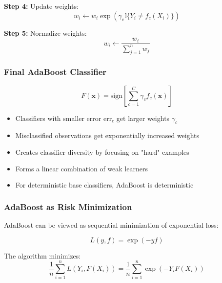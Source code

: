 \documentclass[12pt,a4paper]{article}
\begin{document}
\textbf{Step 4:} Update weights:
\begin{equation}
w_i \leftarrow w_i \exp(\gamma_c \mathbb{I}\{Y_i \neq f_c(X_i)\})
\end{equation}

\textbf{Step 5:} Normalize weights:
\begin{equation}
w_i \leftarrow \frac{w_i}{\sum_{j=1}^n w_j}
\end{equation}

\subsubsection{Final AdaBoost Classifier}

\begin{equation}
F(\mathbf{x}) = \text{sign}\left[\sum_{c=1}^C \gamma_c f_c(\mathbf{x})\right]
\end{equation}

\begin{tcolorbox}[colback=yellow!5!white,colframe=orange!75!black,title=Key Properties of AdaBoost]
\begin{itemize}
    \item Classifiers with smaller error $\text{err}_c$ get larger weights $\gamma_c$
    \item Misclassified observations get exponentially increased weights
    \item Creates classifier diversity by focusing on "hard" examples
    \item Forms a linear combination of weak learners
    \item For deterministic base classifiers, AdaBoost is deterministic
\end{itemize}
\end{tcolorbox}

\subsubsection{AdaBoost as Risk Minimization}

AdaBoost can be viewed as sequential minimization of exponential loss:

\begin{equation}
L(y, f) = \exp(-yf)
\end{equation}

The algorithm minimizes:
\begin{equation}
\frac{1}{n} \sum_{i=1}^n L(Y_i, F(X_i)) = \frac{1}{n} \sum_{i=1}^n \exp(-Y_i F(X_i))
\end{equation}
\end{document}
